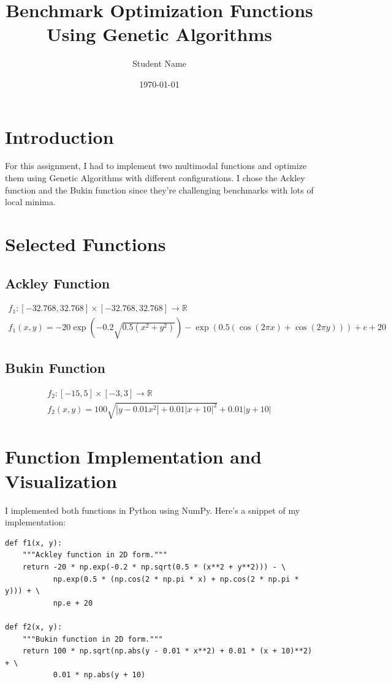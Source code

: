 \documentclass{article}
\title{Benchmark Optimization Functions Using Genetic Algorithms}
\author{Student Name}
\date{\today}
\begin{document}
\maketitle

\section{Introduction}
For this assignment, I had to implement two multimodal functions and optimize them using Genetic Algorithms with different configurations. I chose the Ackley function and the Bukin function since they're challenging benchmarks with lots of local minima.

\section{Selected Functions}
\subsection{Ackley Function}
\begin{align}
f_1: [-32.768, 32.768] \times [-32.768, 32.768] \rightarrow \mathbb{R} \\
f_1(x,y) = -20\exp\left(-0.2\sqrt{0.5(x^2 + y^2)}\right) - \exp\left(0.5(\cos(2\pi x) + \cos(2\pi y))\right) + e + 20
\end{align}

\subsection{Bukin Function}
\begin{align}
f_2: [-15, 5] \times [-3, 3] \rightarrow \mathbb{R} \\
f_2(x,y) = 100\sqrt{|y - 0.01x^2| + 0.01|x + 10|^2} + 0.01|y + 10|
\end{align}

\section{Function Implementation and Visualization}
I implemented both functions in Python using NumPy. Here's a snippet of my implementation:

\begin{verbatim}
def f1(x, y):
    """Ackley function in 2D form."""
    return -20 * np.exp(-0.2 * np.sqrt(0.5 * (x**2 + y**2))) - \
           np.exp(0.5 * (np.cos(2 * np.pi * x) + np.cos(2 * np.pi * y))) + \
           np.e + 20

def f2(x, y):
    """Bukin function in 2D form."""
    return 100 * np.sqrt(np.abs(y - 0.01 * x**2) + 0.01 * (x + 10)**2) + \
           0.01 * np.abs(y + 10)
\end{verbatim}
\end{document}
